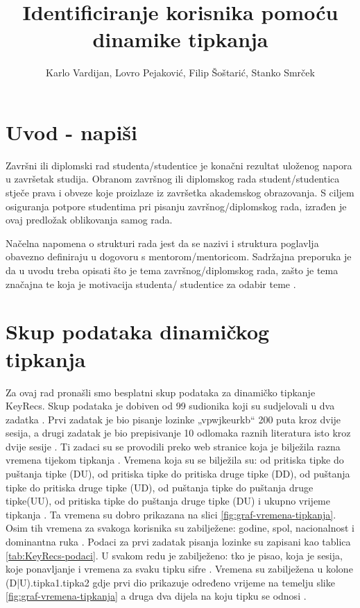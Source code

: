 \documentclass[]{foi}
\title{Identificiranje korisnika pomoću dinamike tipkanja}
\author{Karlo Vardijan, Lovro Pejaković, Filip Šoštarić, Stanko Smrček}
\begin{document}
\maketitle

\tableofcontents

\makeatletter {} \makeatother
\pagestyle{plain}



\chapter{Uvod - napiši}

Završni ili diplomski rad studenta/studentice je konačni rezultat uloženog napora u završetak studija. Obranom završnog ili diplomskog rada student/studentica stječe prava i obveze koje proizlaze iz završetka akademskog obrazovanja. S ciljem osiguranja potpore studentima pri pisanju završnog/diplomskog rada, izrađen je ovaj predložak oblikovanja samog rada.

Načelna napomena o strukturi rada jest da se nazivi i struktura poglavlja obavezno definiraju u dogovoru s mentorom/mentoricom. Sadržajna preporuka je da u uvodu treba opisati što je tema završnog/diplomskog rada, zašto je tema značajna te koja je motivacija studenta/ studentice za odabir teme \cite{oraictolic2011AkademskoPismoStrategije}.



\chapter{Skup podataka dinamičkog tipkanja}
Za ovaj rad pronašli smo besplatni skup podataka za dinamičko tipkanje KeyRecs. Skup podataka je dobiven od 99 sudionika koji su sudjelovali u dva zadatka  \cite{Dias2023}. Prvi zadatak je bio pisanje lozinke „vpwjkeurkb“ 200 puta kroz dvije sesija, a drugi zadatak je bio prepisivanje 10 odlomaka raznih literatura isto kroz dvije sesije \cite{Dias2023}. Ti zadaci su se provodili preko web stranice koja je bilježila razna vremena tijekom tipkanja \cite{Dias2023}. Vremena koja su se bilježila su: od pritiska tipke do puštanja tipke (DU), od pritiska tipke do pritiska druge tipke (DD), od puštanja tipke do pritiska druge tipke (UD), od puštanja tipke do puštanja druge tipke(UU), od pritiska tipke do puštanja druge tipke (DU) i ukupno vrijeme tipkanja \cite{Dias2023}. Ta vremena su dobro prikazana na slici \ref{fig:graf-vremena-tipkanja}. Osim tih vremena za svakoga korisnika su  zabilježene: godine, spol, nacionalnost i dominantna ruka  \cite{Dias2023}. Podaci za prvi zadatak pisanja lozinke su zapisani kao tablica \ref{tab:KeyRecs-podaci}. U svakom redu je zabilježeno: tko je pisao, koja je sesija, koje ponavljanje i vremena za svaku tipku sifre \cite{Dias2023}. Vremena su zabilježena u kolone (D|U).tipka1.tipka2 gdje prvi dio prikazuje određeno vrijeme na temelju slike \ref{fig:graf-vremena-tipkanja} a druga dva dijela na koju tipku se odnosi \cite{Dias2023}.
\end{document}
